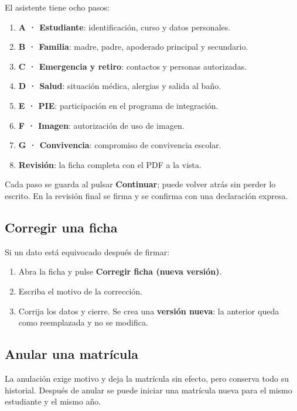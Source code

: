 

El asistente tiene ocho pasos:

\begin{enumerate}[leftmargin=*,itemsep=0.2em]
\item \textbf{A · Estudiante}: identificación, curso y datos personales.
\item \textbf{B · Familia}: madre, padre, apoderado principal y secundario.
\item \textbf{C · Emergencia y retiro}: contactos y personas autorizadas.
\item \textbf{D · Salud}: situación médica, alergias y salida al baño.
\item \textbf{E · PIE}: participación en el programa de integración.
\item \textbf{F · Imagen}: autorización de uso de imagen.
\item \textbf{G · Convivencia}: compromiso de convivencia escolar.
\item \textbf{Revisión}: la ficha completa con el PDF a la vista.
\end{enumerate}

Cada paso se guarda al pulsar \textbf{Continuar}; puede volver atrás sin
perder lo escrito. En la revisión final se firma y se confirma con una
declaración expresa.

\subsection{Corregir una ficha}

Si un dato está equivocado después de firmar:

\begin{enumerate}[leftmargin=*,itemsep=0.2em]
\item Abra la ficha y pulse \textbf{Corregir ficha (nueva versión)}.
\item Escriba el motivo de la corrección.
\item Corrija los datos y cierre. Se crea una \textbf{versión nueva}: la
  anterior queda como reemplazada y no se modifica.
\end{enumerate}

\subsection{Anular una matrícula}

La anulación exige motivo y deja la matrícula sin efecto, pero conserva todo
su historial. Después de anular se puede iniciar una matrícula nueva para el
mismo estudiante y el mismo año.
